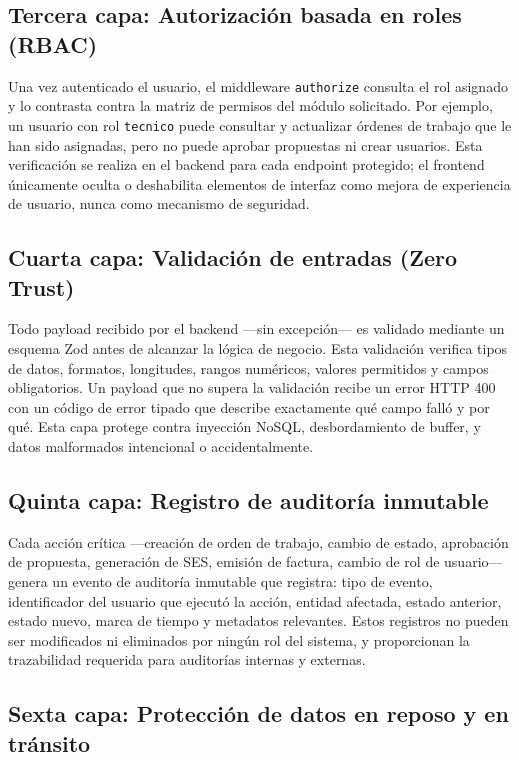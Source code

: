 \subsection{Tercera capa: Autorización basada en roles (RBAC)}

Una vez autenticado el usuario, el middleware \texttt{authorize} consulta el rol asignado y lo contrasta contra la matriz de permisos del módulo solicitado. Por ejemplo, un usuario con rol \texttt{tecnico} puede consultar y actualizar órdenes de trabajo que le han sido asignadas, pero no puede aprobar propuestas ni crear usuarios. Esta verificación se realiza en el backend para cada endpoint protegido; el frontend únicamente oculta o deshabilita elementos de interfaz como mejora de experiencia de usuario, nunca como mecanismo de seguridad.

\subsection{Cuarta capa: Validación de entradas (Zero Trust)}

Todo payload recibido por el backend —sin excepción— es validado mediante un esquema Zod antes de alcanzar la lógica de negocio. Esta validación verifica tipos de datos, formatos, longitudes, rangos numéricos, valores permitidos y campos obligatorios. Un payload que no supera la validación recibe un error HTTP 400 con un código de error tipado que describe exactamente qué campo falló y por qué. Esta capa protege contra inyección NoSQL, desbordamiento de buffer, y datos malformados intencional o accidentalmente.

\subsection{Quinta capa: Registro de auditoría inmutable}

Cada acción crítica —creación de orden de trabajo, cambio de estado, aprobación de propuesta, generación de SES, emisión de factura, cambio de rol de usuario— genera un evento de auditoría inmutable que registra: tipo de evento, identificador del usuario que ejecutó la acción, entidad afectada, estado anterior, estado nuevo, marca de tiempo y metadatos relevantes. Estos registros no pueden ser modificados ni eliminados por ningún rol del sistema, y proporcionan la trazabilidad requerida para auditorías internas y externas.

\subsection{Sexta capa: Protección de datos en reposo y en tránsito}

